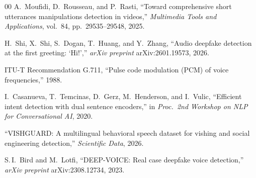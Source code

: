 \documentclass[conference]{IEEEtran}
\begin{document}
\begin{thebibliography}{00}
A.\ Moufidi, D.\ Rousseau, and P.\ Rasti, ``Toward comprehensive short utterances manipulations detection in videos,'' \textit{Multimedia Tools and Applications}, vol.~84, pp.\ 29535--29548, 2025.

H.\ Shi, X.\ Shi, S.\ Dogan, T.\ Huang, and Y.\ Zhang, ``Audio deepfake detection at the first greeting: `Hi!','' \textit{arXiv preprint} arXiv:2601.19573, 2026.

ITU-T Recommendation G.711, ``Pulse code modulation (PCM) of voice frequencies,'' 1988.

I.\ Casanueva, T.\ Temcinas, D.\ Gerz, M.\ Henderson, and I.\ Vulic, ``Efficient intent detection with dual sentence encoders,'' in \textit{Proc.\ 2nd Workshop on NLP for Conversational AI}, 2020.

``VISHGUARD: A multilingual behavioral speech dataset for vishing and social engineering detection,'' \textit{Scientific Data}, 2026.

S.\,I.\ Bird and M.\ Lotfi, ``DEEP-VOICE: Real case deepfake voice detection,'' \textit{arXiv preprint} arXiv:2308.12734, 2023.

\end{thebibliography}
\end{document}
